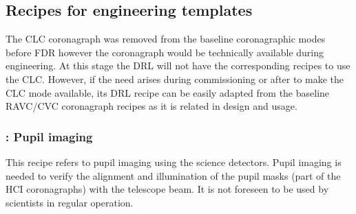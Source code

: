  
\subsection{Recipes for engineering templates}
\label{ssec:recipes_technical}


The CLC coronagraph was removed from the baseline coronagraphic modes before FDR however the coronagraph would be technically available during engineering. At this stage the DRL will not have the corresponding recipes to use the CLC. However, if the need arises during commissioning or after to make the CLC mode available, its DRL recipe can be easily adapted from the baseline RAVC/CVC coronagraph recipes as it is related in design and usage.

\subsubsection{: Pupil imaging}\label{rec:metis_pupil_imaging}
\label{sssec:pupil_imaging}

This recipe refers to pupil imaging using the science detectors.
Pupil imaging is needed to verify the alignment and illumination of the pupil masks (part of the HCI coronagraphs) with the telescope beam.
It is not foreseen to be used by scientists in regular operation.



